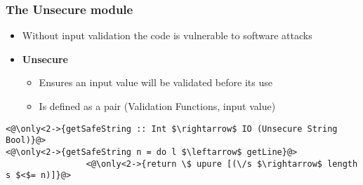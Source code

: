 \begin{frame}
\frametitle{The Unsecure module}
\begin{itemize}
	\item<1> Without input validation the code is vulnerable to software attacks
	\item<2-> \textbf{Unsecure}
	\begin{itemize}
		\item<2-> Ensures an input value will be validated before its use
		\item<2-> Is defined as a pair (Validation Functions, input value)
	\end{itemize}
\end{itemize}	
\begin{center}
\begin{lstlisting}
<@\only<2->{getSafeString :: Int $\rightarrow$ IO (Unsecure String Bool)}@>
<@\only<2->{getSafeString n = do l $\leftarrow$ getLine}@>
                <@\only<2->{return \$ upure [(\/s $\rightarrow$ length s $<$= n)]}@>
\end{lstlisting}
\end{center}
\end{frame}